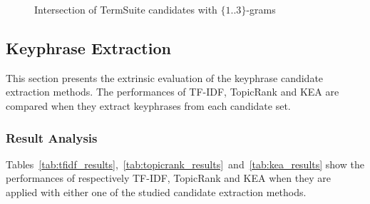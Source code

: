 \begin{figure*}
        \caption{Intersection of TermSuite candidates with $\{1..3\}$-grams
                 \label{fig:candidate_intersections}}
      \end{figure*}

  \subsection{Keyphrase Extraction}
  \label{subsec:keyphrase_extraction}
    This section presents the extrinsic evaluation of the keyphrase candidate
    extraction methods. The performances of TF-IDF, TopicRank and KEA are
    compared when they extract keyphrases from each candidate set.

    \subsubsection{Result Analysis}
    \label{subsubsec:candidate_extraction_result_analysis}
      Tables~\ref{tab:tfidf_results},~\ref{tab:topicrank_results}~and~\ref{tab:kea_results}
      show the performances of respectively TF-IDF, TopicRank and KEA when
      they are applied with either one of the studied candidate extraction
      methods.

